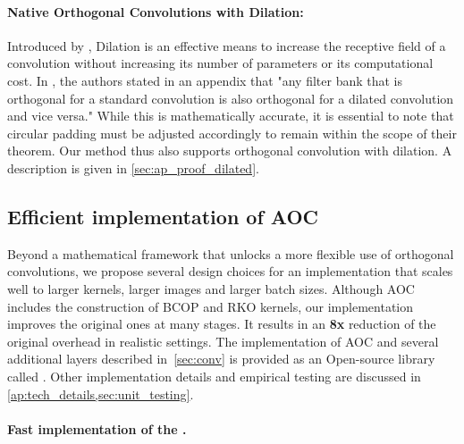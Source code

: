 \paragraph{Native Orthogonal Convolutions with Dilation:}

    Introduced by \cite{yu2015multi}, Dilation is an effective means to increase the receptive field of a convolution without increasing its number of parameters or its computational cost. In  \cite{su_scaling-up_2021}, the authors stated in an appendix that "any filter bank that is orthogonal for a standard convolution is also orthogonal for a dilated convolution and vice versa." While this is mathematically accurate, it is essential to note that circular padding must be adjusted accordingly to remain within the scope of their theorem. Our method thus also supports orthogonal convolution with dilation. A description is given in \cref{sec:ap_proof_dilated}.


\subsection{Efficient implementation of AOC}

\label{sec:implem}
Beyond a mathematical framework that unlocks a more flexible use of orthogonal convolutions, we propose several design choices for an implementation that scales well to larger kernels, larger images and larger batch sizes. Although AOC includes the construction of BCOP and RKO kernels, our implementation improves the original ones at many stages. It results in an \textbf{8x} reduction of the original overhead in realistic settings. The implementation of AOC and several additional layers described in~\cref{sec:conv} is provided as an Open-source library called \fulllibname. 
Other implementation details and empirical testing are discussed in \cref{ap:tech_details,sec:unit_testing}.


\vspace{-1mm}\paragraph{Fast implementation of the \Bconv.}\label{subsec:bconv_implem}

